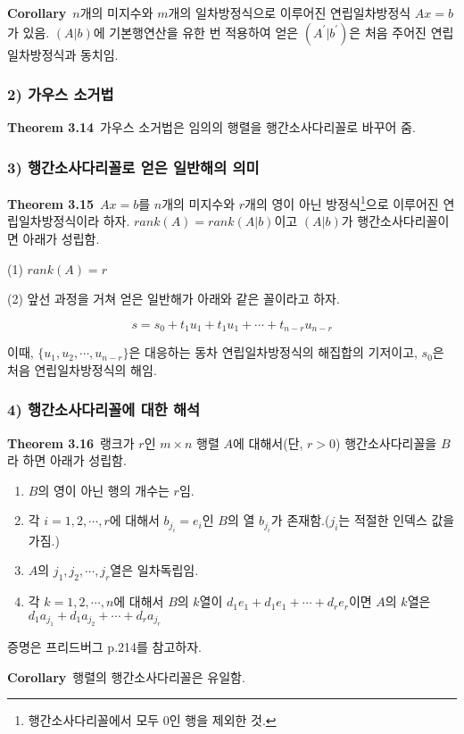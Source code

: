 \textbf{Corollary}\, $n$개의 미지수와 $m$개의 일차방정식으로 이루어진 연립일차방정식 $Ax=b$가 있음. $(A|b)$에 기본행연산을 유한 번 적용하여 얻은 $(A^{\prime}|b^{\prime})$은 처음 주어진 연립일차방정식과 동치임.

\subsubsection*{2) 가우스 소거법}
\textbf{Theorem 3.14}\, 가우스 소거법은 임의의 행렬을 행간소사다리꼴로 바꾸어 줌.

\subsubsection*{3) 행간소사다리꼴로 얻은 일반해의 의미}
\textbf{Theorem 3.15}\, $Ax=b$를 $n$개의 미지수와 $r$개의 영이 아닌 방정식\footnote{행간소사다리꼴에서 모두 0인 행을 제외한 것.}으로 이루어진 연립일차방정식이라 하자. $rank(A)=rank(A|b)$이고 $(A|b)$가 행간소사다리꼴이면 아래가 성립함.

(1) $rank(A)=r$

(2) 앞선 과정을 거쳐 얻은 일반해가 아래와 같은 꼴이라고 하자.

\[
s=s_0+t_1u_1+t_1u_1+ \cdots + t_{n-r}u_{n-r}
\]

이때, $\{u_1,u_2, \cdots ,u_{n-r}\}$은 대응하는 동차 연립일차방정식의 해집합의 기저이고, $s_0$은 처음 연립일차방정식의 해임.

\subsubsection*{4) 행간소사다리꼴에 대한 해석}
\textbf{Theorem 3.16}\, 랭크가 $r$인 $m \times n$ 행렬 $A$에 대해서(단, $r>0$) 행간소사다리꼴을 $B$라 하면 아래가 성립함.

\begin{enumerate}
    \item $B$의 영이 아닌 행의 개수는 $r$임.
    \item 각 $i=1,2, \cdots ,r$에 대해서 $b_{j_i}=e_i$인 $B$의 열 $b_{j_i}$가 존재함.($j_i$는 적절한 인덱스 값을 가짐.)
    \item $A$의 $j_1,j_2, \cdots ,j_r$열은 일차독립임.
    \item 각 $k=1,2, \cdots ,n$에 대해서 $B$의 $k$열이 $d_1e_1+d_1e_1+ \cdots +d_re_r$이면 $A$의 $k$열은 $d_1a_{j_1}+d_1a_{j_2}+ \cdots +d_ra_{j_r}$
\end{enumerate}

증명은 프리드버그 p.214를 참고하자.

\textbf{Corollary}\, 행렬의 행간소사다리꼴은 유일함.


\newpage

